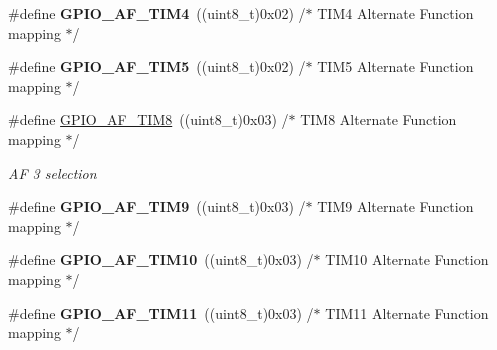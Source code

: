 \begin{DoxyCompactItemize}
\#define {\bfseries G\+P\+I\+O\+\_\+\+A\+F\+\_\+\+T\+I\+M4}~((uint8\+\_\+t)0x02)  /$\ast$ T\+I\+M4 Alternate Function mapping $\ast$/
\item 
\mbox{\label{group___g_p_i_o___alternat__function__selection__define_gad1abee116e98620ade37334e649e6006}} 
\#define {\bfseries G\+P\+I\+O\+\_\+\+A\+F\+\_\+\+T\+I\+M5}~((uint8\+\_\+t)0x02)  /$\ast$ T\+I\+M5 Alternate Function mapping $\ast$/
\item 
\mbox{\label{group___g_p_i_o___alternat__function__selection__define_gaf7562d5cf5d33dbc7b7c69df63182583}} 
\#define \mbox{\hyperlink{group___g_p_i_o___alternat__function__selection__define_gaf7562d5cf5d33dbc7b7c69df63182583}{G\+P\+I\+O\+\_\+\+A\+F\+\_\+\+T\+I\+M8}}~((uint8\+\_\+t)0x03)  /$\ast$ T\+I\+M8 Alternate Function mapping $\ast$/
\begin{DoxyCompactList}\small\item\em AF 3 selection ~\newline
 \end{DoxyCompactList}\item 
\mbox{\label{group___g_p_i_o___alternat__function__selection__define_ga6c7cfbf2f21945814c6526a7bacb1384}} 
\#define {\bfseries G\+P\+I\+O\+\_\+\+A\+F\+\_\+\+T\+I\+M9}~((uint8\+\_\+t)0x03)  /$\ast$ T\+I\+M9 Alternate Function mapping $\ast$/
\item 
\mbox{\label{group___g_p_i_o___alternat__function__selection__define_ga3881c36c71f0cbd7efacb424b39cd9f4}} 
\#define {\bfseries G\+P\+I\+O\+\_\+\+A\+F\+\_\+\+T\+I\+M10}~((uint8\+\_\+t)0x03)  /$\ast$ T\+I\+M10 Alternate Function mapping $\ast$/
\item 
\mbox{\label{group___g_p_i_o___alternat__function__selection__define_gaeb30ba1cb15de0d4af78933e9dcfd033}} 
\#define {\bfseries G\+P\+I\+O\+\_\+\+A\+F\+\_\+\+T\+I\+M11}~((uint8\+\_\+t)0x03)  /$\ast$ T\+I\+M11 Alternate Function mapping $\ast$/
\item 
\mbox{\label{group___g_p_i_o___alternat__function__selection__define_gaa246f87c460c4bb4036b8ab39e0220f1}} 

\end{DoxyCompactItemize}
